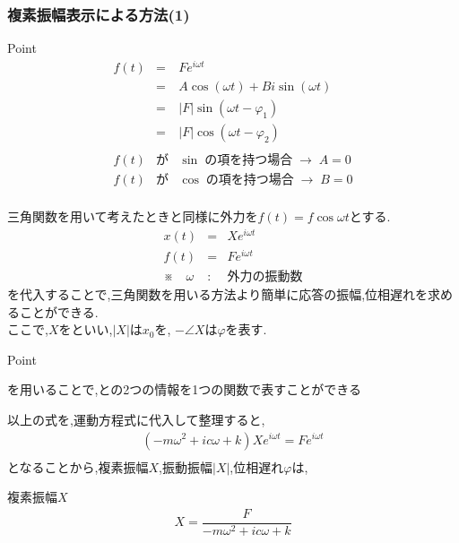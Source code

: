 \documentclass[a4paper]{jsarticle}
\begin{document}
\subsubsection{複素振幅表示による方法(1)}
\begin{itembox}[l]{Point}
    \begin{eqnarray*}
        f\left(t\right)
        &=&Fe^{i\omega t}\\
        &=&A\cos\left(\omega t\right)+Bi\sin\left(\omega t\right)\\
        &=&|F|\sin\left(\omega t -\varphi_1\right)\\
        &=&|F|\cos\left(\omega t -\varphi_2\right)\\
        \\
        f\left(t\right) &が& \sin\; の項を持つ場合\; \rightarrow \; A=0\\
        f\left(t\right) &が& \cos\; の項を持つ場合\; \rightarrow \; B=0\\
    \end{eqnarray*}
\end{itembox}
三角関数を用いて考えたときと同様に外力を$f\left(t\right)=f\cos\omega t$とする.
\begin{eqnarray*}
    x\left(t\right)&=&Xe^{i\omega t}\\
    f\left(t\right)&=&Fe^{i\omega t}\\
    ※\quad\omega &:& 外力の振動数
\end{eqnarray*}
を代入することで,三角関数を用いる方法より簡単に応答の振幅,位相遅れを求めることができる.\\
ここで,$X$をといい,$|X|$は$x_0$を,
$-\angle X$は$\varphi$を表す.\\
\begin{itembox}[l]{Point}
    \begin{center}
        を用いることで,との2つの情報を1つの関数で表すことができる
    \end{center}
\end{itembox}
以上の式を,運動方程式に代入して整理すると,\\
\begin{eqnarray*}
    \left(-m\omega^2+ic\omega+k\right)Xe^{i\omega t}=Fe^{i\omega t}\\
\end{eqnarray*}
となることから,複素振幅$X$,振動振幅$|X|$,位相遅れ$\varphi$は,
\begin{itembox}[l]{複素振幅$X$}
    \begin{eqnarray*}
        X=\dfrac{F}{-m\omega^2+ic\omega+k}\\
    \end{eqnarray*}
\end{itembox}
\end{document}
